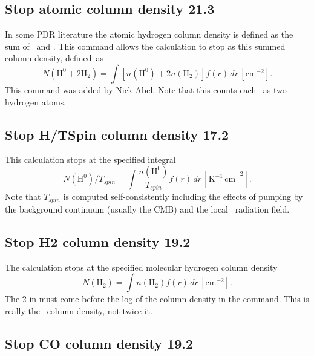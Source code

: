 \subsection{Stop atomic column density 21.3}

In some PDR literature the atomic hydrogen column density is defined
as the sum of \hO\ and \htwo.
This command allows the calculation to stop as
this summed column density, defined~as
\begin{equation}
N\left( {{\mathrm{H}}^0  + 2{\mathrm{H}}_2 } \right) = \int {\left[ {n\left(
{{\mathrm{H}}^0 } \right) + 2n\left( {{\mathrm{H}}_2 } \right)} \right]f\left( r
\right)\,dr}
\,[\mathrm{cm}^{-2}] .%
\end{equation}
This command was added by Nick Abel.
Note that this counts each \htwo\ as two
hydrogen atoms.

\subsection{Stop H/TSpin column density 17.2}

This calculation stops at the specified integral
\begin{equation}
N\left( {{\mathrm{H}}^0 } \right)/T_{spin}  = \int {\frac{{n\left( {{\mathrm{H}}^0
} \right)}}{{T_{spin} }}f\left( r \right)\,dr}
\,[\mathrm{K^{-1}\, cm}^{-2}] .
\end{equation}
Note that $T_{spin}$ is computed self-consistently
including the effects of
pumping by the background continuum (usually the CMB)
and the local \la\ radiation field.

\subsection{Stop H2 column density 19.2}

The calculation stops at the specified molecular hydrogen column density
\begin{equation}
N\left( {{\mathrm{H}}_2 } \right) = \int {n\left( {{\mathrm{H}}_2 } \right)f\left(
r \right)\,dr}
\,[\mathrm{cm}^{-2}] .%
\end{equation}
The 2 in  must come before the log of the
column density in the command.
This is really the \htwo\ column density, not twice it.

\subsection{Stop CO column density 19.2}

